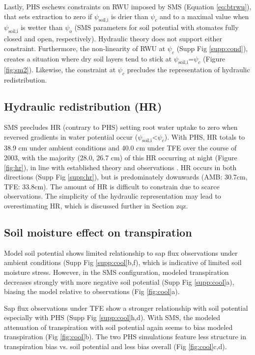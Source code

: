 \documentclass[draft,linenumbers]{agujournal}
\begin{document}
Lastly, PHS eschews constraints on RWU imposed by SMS (Equation \ref{eq:btrwu}), that sets extraction to zero if $\psi_{\text{soil,i}}$ is drier than $\psi_c$ and to a maximal value when $\psi_{\text{soil,i}}$ is wetter than $\psi_o$ (SMS parameters for soil potential with stomates fully closed and open, respectively).
Hydraulic theory does not support either constraint.
Furthermore, the non-linearity of RWU at $\psi_c$ (Supp Fig \ref{supp:cond}), creates a situation where dry soil layers tend to stick at $\psi_{\text{soil,i}}$=$\psi_c$ (Figure \ref{fig:sm2}).
Likewise, the constraint at $\psi_c$ precludes the representation of hydraulic redistribution.

\subsection{Hydraulic redistribution (HR)}
    SMS precludes HR (contrary to PHS) setting root water uptake to zero when reversed gradients in water potential occur ($\psi_{\text{soil,i}}$<$\psi_c$).
    With PHS, HR totals to 38.9 cm under ambient conditions and 40.0 cm under TFE over the course of 2003, with the majority (28.0, 26.7 cm) of this HR occurring at night (Figure \ref{fig:hr}),
    in line with established theory \citep{jackson2000,lee2005} and observations \citep{oliveira2005,burgess1998}.
    HR occurs in both directions (Supp Fig \ref{supp:hr}), but is predominately downwards (AMB: 30.7cm, TFE: 33.8cm).
    The amount of HR is difficult to constrain due to scarce observations.
    The simplicity of the hydraulic representation may lead to overestimating HR, which is discussed further in Section zqz.

\subsection{Soil moisture effect on transpiration}    
    Model soil potential shows limited relationship to sap flux observations under ambient conditions (Supp Fig \ref{supp:cool}b,f), which is indicative of limited soil moisture stress.
    However, in the SMS configuration, modeled transpiration decreases strongly with more negative soil potential (Supp Fig \ref{supp:cool}a),
    biasing the model relative to observations (Fig \ref{fig:cool}a).
    
    Sap flux observations under TFE show a stronger relationship with soil potential especially with PHS (Supp Fig \ref{supp:cool}h,d).
    With SMS, the modeled attenuation of transpiration with soil potential again seems to bias modeled transpiration (Fig \ref{fig:cool}b).
    The two PHS simulations feature less structure in transpiration bias vs. soil potential and less bias overall (Fig \ref{fig:cool}c,d).
    
\end{document}
